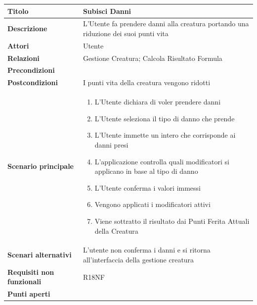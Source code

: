 \documentclass[a4paper, 11pt]{article}
\begin{document}
\begin{center}
\begin{tabular}{ |p{5cm}|p{9.5cm}|  }
\hline
\textbf{Titolo} & Subisci Danni \\
\hline
\textbf{Descrizione} & L'Utente fa prendere danni alla creatura portando una riduzione dei suoi punti vita \\
\hline
\textbf{Attori} & Utente \\
\hline
\textbf{Relazioni} & Gestione Creatura; Calcola Risultato Formula \\
\hline
\textbf{Precondizioni} & \\
\hline
\textbf{Postcondizioni} & I punti vita della creatura vengono ridotti \\
\hline
\textbf{Scenario principale} & 
\begin{enumerate}
    \item L'Utente dichiara di voler prendere danni
    \item L'Utente seleziona il tipo di danno che prende
    \item L'Utente immette un intero che corrisponde ai danni presi
    \item L'applicazione controlla quali modificatori si applicano in base al tipo di danno
    \item L'Utente conferma i valori immessi
    \item Vengono applicati i modificatori attivi
    \item Viene sottratto il risultato dai Punti Ferita Attuali della Creatura
\end{enumerate}\\
\hline
\textbf{Scenari alternativi} & L'utente non conferma i danni e si ritorna all'interfaccia della gestione creatura\\
\hline
\textbf{Requisiti non funzionali} & R18NF \\
\hline
\textbf{Punti aperti} & \\
\hline
\end{tabular}

\vspace{3em}


\end{center}
\end{document}
